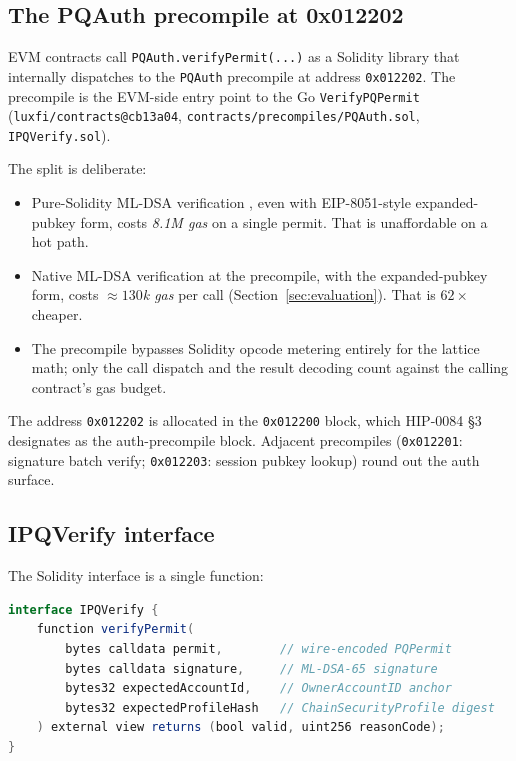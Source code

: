 \subsection{The PQAuth precompile at 0x012202}

EVM contracts call \texttt{PQAuth.verifyPermit(...)} as a Solidity library
that internally dispatches to the \texttt{PQAuth} precompile at address
\texttt{0x012202}. The precompile is the EVM-side entry point to the Go
\texttt{VerifyPQPermit} (\texttt{luxfi/contracts@cb13a04},
\texttt{contracts/precompiles/PQAuth.sol}, \texttt{IPQVerify.sol}).

The split is deliberate:

\begin{itemize}[leftmargin=2em,nosep]
  \item Pure-Solidity ML-DSA verification \cite{ethdilithium}, even with
    EIP-8051-style expanded-pubkey form, costs \emph{8.1M gas} on a single
    permit. That is unaffordable on a hot path.
  \item Native ML-DSA verification at the precompile, with the
    expanded-pubkey form, costs \emph{$\approx 130$k gas} per call
    (Section~\ref{sec:evaluation}). That is $62\times$ cheaper.
  \item The precompile bypasses Solidity opcode metering entirely for the
    lattice math; only the call dispatch and the result decoding count
    against the calling contract's gas budget.
\end{itemize}

The address \texttt{0x012202} is allocated in the \texttt{0x012200} block,
which HIP-0084 §3 designates as the auth-precompile block. Adjacent
precompiles (\texttt{0x012201}: signature batch verify; \texttt{0x012203}:
session pubkey lookup) round out the auth surface.

\subsection{IPQVerify interface}

The Solidity interface is a single function:

\begin{lstlisting}[language=Java,caption={IPQVerify.sol --- contract-side
entry point. Source: \texttt{luxfi/contracts@cb13a04},
\texttt{contracts/precompiles/IPQVerify.sol}.}]
interface IPQVerify {
    function verifyPermit(
        bytes calldata permit,        // wire-encoded PQPermit
        bytes calldata signature,     // ML-DSA-65 signature
        bytes32 expectedAccountId,    // OwnerAccountID anchor
        bytes32 expectedProfileHash   // ChainSecurityProfile digest
    ) external view returns (bool valid, uint256 reasonCode);
}
\end{lstlisting}

